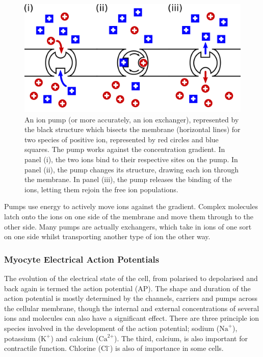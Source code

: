 \begin{figure}
\begin{center}
\includegraphics{figures/intro/ion_pump}
\end{center}
\caption[Ion Pump]{
\label{fig:intro:heart:ion_pump}
An ion pump (or more accurately, an ion exchanger), represented by the black
structure which bisects the membrane (horizontal lines) for two species of
positive ion, represented by red circles and blue squares.
The pump works against the concentration gradient.
In panel (i), the two ions bind to their respective sites on the pump.
In panel (ii), the pump changes its structure, drawing each ion through the
membrane.
In panel (iii), the pump releases the binding of the ions, letting them rejoin
the free ion populations.
}
\end{figure}

Pumps use energy to actively move ions against the gradient.
Complex molecules latch onto the ions on one side of the membrane and move them
through to the other side.
Many pumps are actually exchangers, which take in ions of one sort on one side
whilst transporting another type of ion the other way.

\subsubsection{Myocyte Electrical Action Potentials}

The evolution of the electrical state of the cell, from polarised to depolarised
and back again is termed the action potential (AP).
The shape and duration of
the action potential is mostly determined by the channels, carriers and pumps
across the cellular membrane, though the internal and external concentrations of
several ions and molecules can also have a significant effect.
There are three
principle ion species involved in the development of the action potential;
sodium ($\text{Na}^{\text{+}}$), potassium ($\text{K}^{\text{+}}$) and calcium
($\text{Ca}^{\text{2+}}$).
The third, calcium, is also important for contractile function.
Chlorine ($\text{Cl}^{\text{-}}$) is also of importance in some cells.

